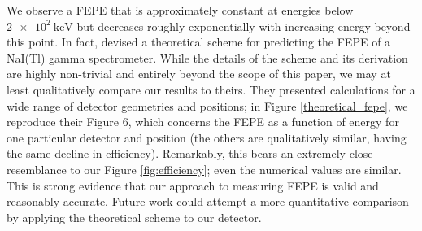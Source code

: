 \documentclass[twocol]{ametsocV6.1}
\begin{document}
We observe a FEPE that is approximately constant at energies below
$\SI{2e2}{\kilo\electronvolt}$ but decreases roughly exponentially
with increasing energy beyond this point.
In fact, \cite{theoretical_fepe} devised a theoretical scheme for
predicting the FEPE of a NaI(Tl) gamma spectrometer.
While the details of the scheme and its derivation are highly non-trivial and
entirely beyond the scope of this paper, we may at least qualitatively
compare our results to theirs. They presented calculations
for a wide range of detector geometries and positions; in Figure
\ref{theoretical_fepe}, we reproduce their Figure 6, which concerns
the FEPE as a function of energy for
one particular detector and position (the others are qualitatively similar,
having the same decline in efficiency). Remarkably, this bears
an extremely close resemblance to our Figure \ref{fig:efficiency};
even the numerical values are similar. This is strong evidence that
our approach to measuring FEPE is valid and reasonably accurate.
Future work could attempt a more quantitative comparison by
applying the theoretical scheme to our detector.
\end{document}
